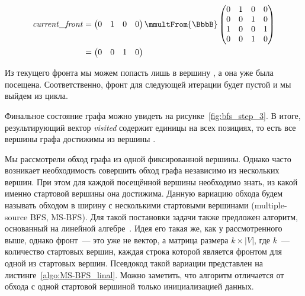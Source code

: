 \begin{example}
    \begin{align*}
        \mathit{current\_front} & =
        \begin{pmatrix}
            0 & 1 & 0 & 0
        \end{pmatrix}\mmultFrom{\BbbB}
        \begin{pmatrix}
            0 & 1 & 0 & 0 \\
            0 & 0 & 1 & 0 \\
            1 & 0 & 0 & 1 \\
            0 & 0 & 1 & 0
        \end{pmatrix}            \\ &=
        \begin{pmatrix}
            0 & 0 & 1 & 0
        \end{pmatrix}
    \end{align*}

    Из текущего фронта мы можем попасть лишь в вершину , а она уже была посещена.
    Соответственно, фронт для следующей итерации будет пустой и мы выйдем из цикла.

    \begin{marginfigure}
        \begin{center}
            \resizebox{\marginparwidth}{!}{}
        \end{center}
        \caption{Обход в ширину, шаг третий}
        \label{fig:bfs_step_3}
    \end{marginfigure}

    Финальное состояние графа можно увидеть на рисунке~\ref{fig:bfs_step_3}.
    В итоге, результирующий вектор \emph{visited} содержит единицы на всех позициях, то есть все вершины графа достижимы из вершины .

\end{example}

Мы рассмотрели обход графа из одной фиксированной вершины.
Однако часто возникает необходимость совершить обход графа независимо из нескольких вершин.
При этом для каждой посещённой вершины необходимо знать, из какой именно стартовой вершины она достижима.
Данную вариацию обхода будем называть обходом в ширину с несколькими стартовыми вершинами (multiple-source BFS, MS-BFS).
Для такой постановки задачи также предложен алгоритм, основанный на линейной алгебре~.
Идея его такая же, как у рассмотренного выше, однако фронт~--- это уже не вектор, а матрица размера $k \times |V|$, где $k$~--- количество стартовых вершин, каждая строка которой является фронтом для одной из стартовых вершин.
Псевдокод такой вариации представлен на листинге~\ref{algo:MS-BFS_linal}.
Можно заметить, что алгоритм отличается от обхода с одной стартовой вершиной только инициализацией данных.

